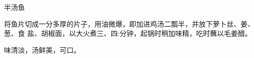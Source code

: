 \begin{recipe}{半汤鱼}

\ingredients


\cooking

将鱼片切成一分多厚的片子，用油微爆，即加进鸡汤二瓢半，并放下萝卜丝、姜、葱、食
盐、胡椒面，以大火煮三、四:分钟，起锅时稍加味精，吃时蘸以毛姜醋。

\notes

味清淡，汤鲜美，可口。

\end{recipe}

